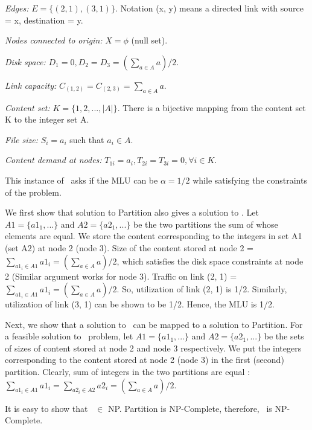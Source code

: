 {\noindent\emph{Edges:}  $E =  \{ (2, 1) , (3, 1)\}$. Notation (x, y) means a directed link with  source = x,  destination = y.

\vsp

\noindent\emph{Nodes connected to origin:}  $X = \phi$ (null set).

\vsp

\noindent\emph{Disk space:}  $D_1 = 0, D_2 =  D_3 = (\sum_{a \in A} a)/2$.

\vsp

\noindent\emph{Link capacity:}  $C_{(1, 2)} = C_{(2, 3)} = \sum_{a \in A} a$.

\vsp

\noindent\emph{Content set:}  $K = \{1, 2, ..., |A|\} $. There is a bijective mapping from the content set K to the integer set A.

\vsp

\noindent\emph{File size:}  $S_{i} = a_i$  such that $ a_i \in A$.

\vsp

\noindent\emph{Content demand at nodes:}  $T_{1i} = a_i, T_{2i} = T_{3i} = 0,  \forall i \in K$.


This instance of \optloc\ asks if the MLU can be $\alpha = 1/2$ while satisfying the constraints of the problem. 

We first show that solution to Partition also gives a solution to \optloc. Let $A1 = \{a1_1, ... \}$ and  $A2 = \{a2_1, ... \}$ be the two partitions the sum of whose elements are equal.  We store the content corresponding to the integers in set A1 (set A2) at node  2 (node 3). Size of the content stored at node 2 = $\sum_{a1_i \in A1} a1_i =  (\sum_{a \in A} a)/2$, which satisfies the disk space constraints at node 2  (Similar argument works for node 3). Traffic on link (2, 1) = $\sum_{a1_i \in A1} a1_i =  (\sum_{a \in A} a)/2$. So, utilization of link (2, 1) is 1/2.  Similarly, utilization of link (3, 1) can be shown to be 1/2. Hence, the MLU is 1/2.


Next, we show that a solution to \optloc\ can be mapped to a solution to Partition. For a feasible solution to \optloc\ problem, let $A1 = \{a1_1, ... \}$ and  $A2 = \{a2_1, ... \}$ be the sets of sizes of content stored at node 2 and node 3 respectively. We put the integers corresponding to the content stored at node 2 (node 3) in the first (second) partition. Clearly, sum of integers in the two partitions are equal : $\sum_{a1_i \in A1} a1_i   = \sum_{a2_i \in A2} a2_i = (\sum_{a \in A} a)/2$.

It is easy to show that \optloc\ $\in$ NP. Partition is NP-Complete, therefore, \optloc\ is  NP-Complete. 


}

